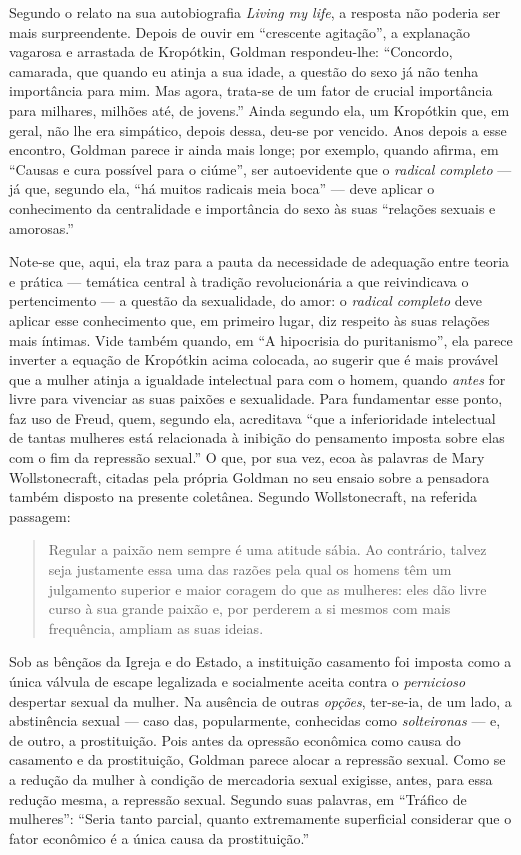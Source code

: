 Segundo o relato na sua
autobiografia \textit{Living my life}, a resposta não poderia ser mais
surpreendente. Depois de ouvir em ``crescente agitação'', a explanação
vagarosa e arrastada de Kropótkin, Goldman respondeu-lhe: ``Concordo,
camarada, que quando eu atinja a sua idade, a questão do sexo já não
tenha importância para mim. Mas agora, trata-se de um fator de
crucial importância para milhares, milhões até, de jovens.'' Ainda
segundo ela, um Kropótkin que, em geral, não lhe era simpático, depois
dessa, deu-se por vencido. Anos depois a esse encontro, Goldman parece
ir ainda mais longe; por exemplo, quando afirma, em ``Causas e cura
possível para o ciúme'', ser autoevidente que o \textit{radical completo} ---
já que, segundo ela, ``há muitos radicais meia boca'' --- deve aplicar o
conhecimento da centralidade e importância do sexo às suas ``relações
sexuais e amorosas.'' 

Note-se que, aqui, ela traz para a pauta da
necessidade de adequação entre teoria e prática --- temática central à
tradição revolucionária a que reivindicava o pertencimento --- a questão
da sexualidade, do amor: o \textit{radical completo} deve aplicar esse
conhecimento que, em primeiro lugar, diz respeito às suas relações mais
íntimas. Vide também quando, em ``A hipocrisia do puritanismo'', ela
parece inverter a equação de Kropótkin acima colocada, ao sugerir que é
mais provável que a mulher atinja a igualdade intelectual para com o
homem, quando \textit{antes} for livre para vivenciar as suas paixões e
sexualidade. Para fundamentar esse ponto, faz uso de Freud, quem,
segundo ela, acreditava ``que a inferioridade intelectual de tantas
mulheres está relacionada à inibição do pensamento imposta sobre elas
com o fim da repressão sexual.'' O que, por sua vez, ecoa às palavras de
Mary Wollstonecraft, citadas pela própria Goldman no seu ensaio sobre a
pensadora também disposto na presente coletânea. Segundo Wollstonecraft,
na referida passagem:

\begin{quote}
Regular a paixão nem sempre é uma atitude sábia. Ao contrário, talvez
seja justamente essa uma das razões pela qual os homens têm um
julgamento superior e maior coragem do que as mulheres: eles dão livre
curso à sua grande paixão e, por perderem a si mesmos com mais
frequência, ampliam as suas ideias.
\end{quote}

Sob as bênçãos da Igreja e do Estado, a instituição casamento foi
imposta como a única válvula de escape legalizada e socialmente aceita
contra o \textit{pernicioso} despertar sexual da mulher. Na ausência de
outras \textit{opções}, ter-se-ia, de um lado, a abstinência sexual --- caso
das, popularmente, conhecidas como \textit{solteironas} --- e, de outro, a
prostituição. Pois antes da opressão econômica como causa do casamento e
da prostituição, Goldman parece alocar a repressão sexual. Como se a
redução da mulher à condição de mercadoria sexual exigisse,
antes, para essa redução mesma, a repressão sexual. Segundo suas
palavras, em ``Tráfico de mulheres'': ``Seria tanto parcial, quanto
extremamente superficial considerar que o fator econômico é a única
causa da prostituição.''

